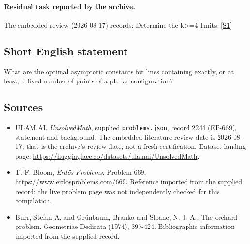 \documentclass[11pt,a4paper]{article}
\newcommand{\sref}[2]{\hyperlink{source:#1:#2}{[S#2]}}
\begin{document}
\paragraph{Residual task reported by the archive.}

The embedded review (2026-08-17) records: Determine the k>=4 limits. \sref{2244}{1}

\subsection{Short English statement}

What are the optimal asymptotic constants for lines containing exactly, or at least, a fixed number of points of a planar configuration?

\subsection{Sources}

{\small

\begin{itemize}

\item[\hypertarget{source:2244:1}{S1}] ULAM.AI, \emph{UnsolvedMath}, supplied \texttt{problems.json}, record 2244 (EP-669), statement and background. The embedded literature-review date is 2026-08-17; that is the archive’s review date, not a fresh certification. Dataset landing page: \url{https://huggingface.co/datasets/ulamai/UnsolvedMath}.

\item[\hypertarget{source:2244:2}{S2}] T. F. Bloom, \emph{Erdős Problems}, Problem 669, \url{https://www.erdosproblems.com/669}. Reference imported from the supplied record; the live problem page was not independently checked for this compilation.

\item[\hypertarget{source:2244:3}{S3}] Burr, Stefan A. and Gr\"{u}nbaum, Branko and Sloane, N. J. A., The orchard problem. Geometriae Dedicata (1974), 397-424. Bibliographic information imported from the supplied record.

\end{itemize}

}

\label{end:2244}
\end{document}
